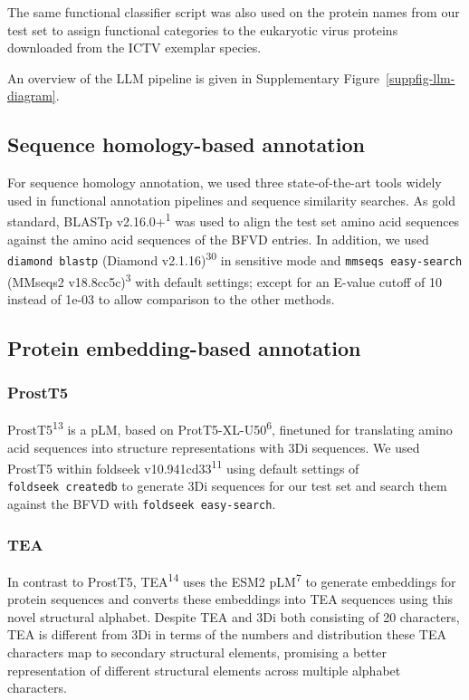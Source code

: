 \documentclass[
  sn-nature,
]{sn-jnl}
\begin{document}
The same functional classifier script was also used on the protein names
from our test set to assign functional categories to the eukaryotic
virus proteins downloaded from the ICTV exemplar species.

An overview of the LLM pipeline is given in
Supplementary Figure~\ref{suppfig-llm-diagram}.

\subsection{Sequence homology-based
annotation}\label{sequence-homology-based-annotation}

For sequence homology annotation, we used three state-of-the-art tools
widely used in functional annotation pipelines and sequence similarity
searches. As gold standard, BLASTp v2.16.0+\textsuperscript{1} was used
to align the test set amino acid sequences against the amino acid
sequences of the BFVD entries. In addition, we used
\texttt{diamond\ blastp} (Diamond v2.1.16)\textsuperscript{30} in
sensitive mode and \texttt{mmseqs\ easy-search} (MMseqs2
v18.8cc5c)\textsuperscript{3} with default settings; except for an
E-value cutoff of 10 instead of 1e-03 to allow comparison to the other
methods.

\subsection{Protein embedding-based
annotation}\label{protein-embedding-based-annotation}

\subsubsection{ProstT5}\label{prostt5}

ProstT5\textsuperscript{13} is a pLM, based on
ProtT5-XL-U50\textsuperscript{6}, finetuned for translating amino acid
sequences into structure representations with 3Di sequences. We used
ProstT5 within foldseek v10.941cd33\textsuperscript{11} using default
settings of \texttt{foldseek\ createdb} to generate 3Di sequences for
our test set and search them against the BFVD with
\texttt{foldseek\ easy-search}.

\subsubsection{TEA}\label{tea}

In contrast to ProstT5, TEA\textsuperscript{14} uses the ESM2
pLM\textsuperscript{7} to generate embeddings for protein sequences and
converts these embeddings into TEA sequences using this novel structural
alphabet. Despite TEA and 3Di both consisting of 20 characters, TEA is
different from 3Di in terms of the numbers and distribution these TEA
characters map to secondary structural elements, promising a better
representation of different structural elements across multiple alphabet
characters.
\end{document}
